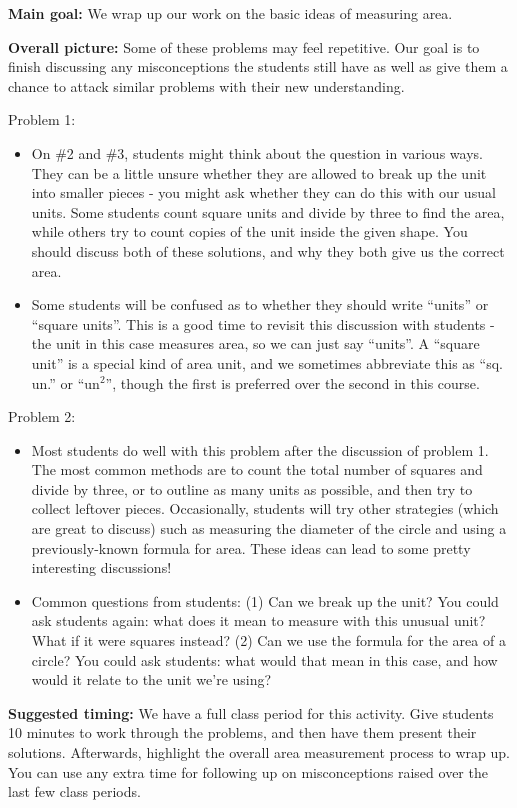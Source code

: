 \documentclass[nooutcomes,noauthor, handout]{ximera}
\begin{document}
\newpage


\begin{instructorNotes}

{\bf Main goal:} We wrap up our work on the basic ideas of measuring area.

{\bf Overall picture:} Some of these problems may feel repetitive. Our goal is to finish discussing any misconceptions the students still have as well as give them a chance to attack similar problems with their new understanding.


Problem 1:
\begin{itemize}
\item    On \#2 and \#3, students might think about the question in various ways.  They can be a little unsure whether they are allowed to break up the unit into smaller pieces - you might ask whether they can do this with our usual units.  Some students count square units and divide by three to find the area, while others try to count copies of the unit inside the given shape.  You should discuss both of these solutions, and why they both give us the correct area.
    
\item    Some students will be confused as to whether they should write ``units'' or ``square units''.  This is a good time to revisit this discussion with students - the unit in this case measures area, so we can just say ``units''.  A ``square unit'' is a special kind of area unit, and we sometimes abbreviate this as ``sq. un.'' or ``un$^2$'', though the first is preferred over the second in this course.
\end{itemize}


Problem 2:
\begin{itemize}
\item     Most students do well with this problem after the discussion of problem 1.  The most common methods are to count the total number of squares and divide by three, or to outline as many units as possible, and then try to collect leftover pieces.  Occasionally, students will try other strategies (which are great to discuss) such as measuring the diameter of the circle and using a previously-known formula for area.  These ideas can lead to some pretty interesting discussions!
    
\item     Common questions from students: (1) Can we break up the unit?  You could ask students again: what does it mean to measure with this unusual unit?  What if it were squares instead? (2) Can we use the formula for the area of a circle?  You could ask students: what would that mean in this case, and how would it relate to the unit we're using?
\end{itemize}

{\bf Suggested timing:} We have a full class period for this activity. Give students 10 minutes to work through the problems, and then have them present their solutions. Afterwards, highlight the overall area measurement process to wrap up. You can use any extra time for following up on misconceptions raised over the last few class periods.


\end{instructorNotes}
\end{document}
